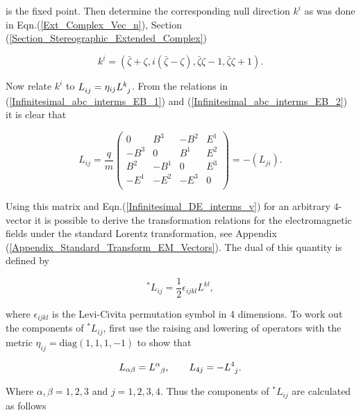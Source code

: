 \noindent is the fixed point. Then determine the corresponding null direction $k^i$ as was done in Eqn.(\ref{Ext_Complex_Vec_n}), Section (\ref{Section_Stereographic_Extended_Complex})

\begin{equation}\label{Infinitesimal_K_Unit_Vector_Formula}
k^i = \left(\bar{\zeta} + \zeta,i(\bar{\zeta} - \zeta),\bar{\zeta}\zeta - 1,\bar{\zeta}\zeta + 1\right).
\end{equation}

\noindent Now relate $k^i$ to $\tensor{L}{_i_j} = \eta_{ij} \tensor{L}{^k_j}$. From the relations in (\ref{Infinitesimal_abc_interms_EB_1}) and (\ref{Infinitesimal_abc_interms_EB_2}) it is clear that

\begin{equation*}  
L_{ij} = 
\frac{q}{m}
\left(
\begin{array}{cccc}
0    & B^3  & -B^2 & E^1 \\
-B^3 & 0    & B^1  & E^2 \\
B^2  & -B^1 & 0    & E^3 \\
-E^1 & -E^2 & -E^3 & 0   \\
\end{array}
\right)
=
-(L_{ji}).
\end{equation*}

\noindent Using this matrix and Eqn.(\ref{Infinitesimal_DE_interms_v}) for an arbitrary $4$-vector it is possible to derive the transformation relations for the electromagnetic fields under the standard Lorentz transformation, see Appendix (\ref{Appendix_Standard_Transform_EM_Vectors}). The dual of this quantity is defined by

\begin{equation*}
^*L_{ij} = \frac{1}{2} \epsilon_{ijkl} L^{kl},
\end{equation*}

\noindent where $\epsilon_{ijkl}$ is the Levi-Civita permutation symbol in 4 dimensions. To work out the components of $^*L_{ij}$, first use the raising and lowering of operators with the metric $\eta_{ij} = \text{diag}(1,1,1,-1)$ to show that  

\begin{equation*}
L_{\alpha \beta} = \tensor{L}{^\alpha_\beta}, \qquad L_{4 j} = - \tensor{L}{^4_j}.
\end{equation*}

\noindent Where $\alpha,\beta = 1,2,3$ and $j = 1,2,3,4$. Thus the components of $^*L_{ij}$ are calculated as follows

